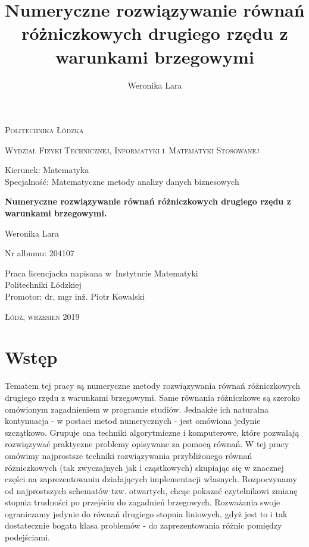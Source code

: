 \documentclass[12pt,a4paper]{report}
\author{Weronika Lara}
\title{Numeryczne rozwiązywanie równań różniczkowych drugiego rzędu z warunkami brzegowymi}
\begin{document}
\begin{titlepage}
\begin{flushleft}
\end{flushleft}
\begin{center}
\textsc{{\huge Politechnika Łódzka}}
\end{center}
\bigskip
\bigskip
\begin{center}
\textsc{{\Large Wydział Fizyki Technicznej, Informatyki i~Matematyki Stosowanej}}
\end{center}
\bigskip
\bigskip
\begin{Large}
Kierunek: Matematyka 
\\Specjalność: Matematyczne metody analizy danych biznesowych

\end{Large}
\bigskip
\bigskip
\noindent\hrulefill
\begin{center}
{\textbf{{\Large Numeryczne rozwiązywanie równań różniczkowych drugiego rzędu z warunkami brzegowymi.}}}
\end{center}
\begin{flushright}
{\large 
Weronika Lara

Nr albumu: 
204107
}
\end{flushright}
\noindent\hrulefill
\bigskip
\bigskip
\begin{center}
{\large Praca licencjacka
napisana w~Instytucie Matematyki 
\\Politechniki Łódzkiej 
\bigskip
\bigskip
\\Promotor: dr, mgr inż. Piotr Kowalski
 }
\end{center}
\bigskip
\bigskip
\bigskip
\bigskip
\begin{center}
{\textsc{\large Łódź, wrzesień 2019}}
\end{center}
\end{titlepage}
\tableofcontents

\chapter{Wstęp}

Tematem tej pracy są numeryczne metody rozwiązywania równań różniczkowych drugiego rzędu z warunkami brzegowymi. Same równania różniczkowe są szeroko omówionym zagadnieniem w programie studiów. Jednakże ich naturalna kontynuacja - w postaci metod numerycznych - jest omówiona jedynie szczątkowo. Grupuje ona techniki algorytmiczne i komputerowe, które pozwalają rozwiązywać praktyczne problemy opisywane za pomocą równań. W tej pracy omówimy najprostsze techniki rozwiązywania przybliżonego równań różniczkowych (tak zwyczajnych jak i cząstkowych) skupiając się w znacznej części na zaprezentowaniu działających implementacji własnych. Rozpoczynamy od najprostszych schematów tzw. otwartych, chcąc pokazać czytelnikowi zmianę stopnia trudności po przejściu do zagadnień brzegowych. Rozważania swoje ograniczamy jedynie do równań drugiego stopnia liniowych, gdyż jest to i tak dostatecznie bogata klasa problemów - do zaprezentowania różnic pomiędzy podejściami. 
\end{document}

